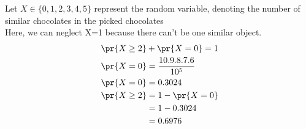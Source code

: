 
Let $X \in \{0,1,2,3,4,5\}$ represent the random variable, denoting the number of similar chocolates in the picked chocolates\\
Here, we can neglect X=1 because there can't be one similar object. \\
\begin{align}
    \pr{X\geq2}&+\pr{X=0}=1\\
    \pr{X=0}&=\frac{10.9.8.7.6}{10^5}\\
    \pr{X=0}&=0.3024\\
    \pr{X\geq 2}&=1-\pr{X=0}\\
    &=1-0.3024\\
    &=0.6976
\end{align}